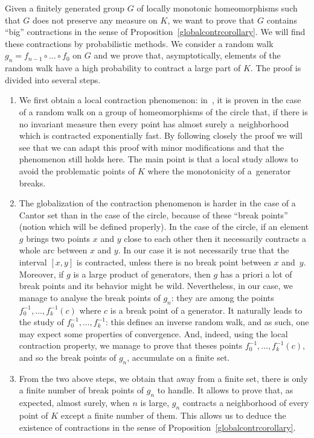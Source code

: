 \documentclass[AHL,Unicode,longabstracts,published]{cedram}
\newcounter{setofcase}
\newcounter{case}[setofcase]
\begin{document}
Given a finitely generated group $G$ of locally monotonic homeomorphisms such that $G$ does not preserve any measure on $K$, we want to prove that $G$ contains ``big'' contractions in the sense of Proposition~\ref{globalcontrcorollary}. We will find these contractions by probabilistic methods. We consider a random walk $g_n=f_{n-1}\circ\dots\circ f_0$ on $G$ and we prove that, asymptotically, elements of the random walk have a high probability to contract a large part of $K$. The proof is divided into several steps.
\begin{enumerate}
\item We first obtain a local contraction phenomenon: in~\cite{Mal}, it is proven in the case of a random walk on a group of homeomorphisms of the circle that, if there is no invariant measure then every point has almost surely a~neighborhood which is contracted exponentially fast. By following closely the proof we will see that we can adapt this proof with minor modifications and that the phenomenon still holds here. The main point is that a local study allows to avoid the problematic points of $K$ where the monotonicity of a~generator breaks.

\item The globalization of the contraction phenomenon is harder in the case of a Cantor set than in the case of the circle, because of these ``break points'' (notion which will be defined properly). In the case of the circle, if an element $g$ brings two points $x$ and $y$ close to each other then it necessarily contracts a whole arc between $x$ and $y$. In our case it is not necessarily true that the interval $[x,y]$ is contracted, unless there is no break point between $x$ and~$y$. Moreover, if $g$ is a large product of generators, then $g$ has a priori a lot of break points and its behavior might be wild. Nevertheless, in our case, we manage to analyse the break points of $g_n$: they are among the points $f_0^{-1},\dots, f_k^{-1}(c)$ where $c$ is a break point of a generator. It naturally leads to the study of $f_0^{-1},\dots,f_k^{-1}$: this defines an inverse random walk, and as such, one may expect some properties of convergence. And, indeed, using the local contraction property, we manage to prove that theses points $f_0^{-1},\dots,f_k^{-1}(c)$, and so the break points of $g_n$, accumulate on a finite set.

\item From the two above steps, we obtain that away from a finite set, there is only a finite number of break points of $g_n$ to handle. It allows to prove that, as expected, almost surely, when $n$ is large, $g_n$ contracts a neighborhood of every point of $K$ except a finite number of them. This allows us to deduce the existence of contractions in the sense of Proposition~\ref{globalcontrcorollary}.
\end{enumerate}
\end{document}
